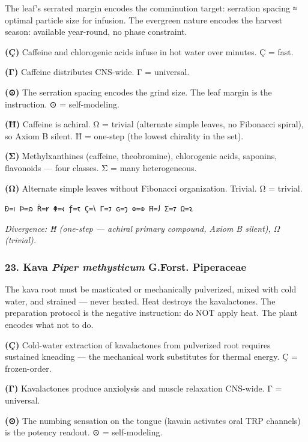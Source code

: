 \documentclass[12pt,a4paper]{article}
\begin{document}
The leaf's serrated margin encodes the comminution target: serration
spacing ≈ optimal particle size for infusion. The evergreen nature
encodes the harvest season: available year-round, no phase constraint.

\textbf{(Ç)} Caffeine and chlorogenic acids infuse in hot water over
minutes. Ç = fast.

\textbf{(Γ)} Caffeine distributes CNS-wide. Γ = universal.

\textbf{(⊙)} The serration spacing encodes the grind size. The leaf
margin is the instruction. ⊙ = self-modeling.

\textbf{(Ħ)} Caffeine is achiral. Ω = trivial (alternate simple leaves,
no Fibonacci spiral), so Axiom B silent. Ħ = one-step (the lowest
chirality in the set).

\textbf{(Σ)} Methylxanthines (caffeine, theobromine), chlorogenic acids,
saponins, flavonoids --- four classes. Σ = many heterogeneous.

\textbf{(Ω)} Alternate simple leaves without Fibonacci organization.
Trivial. Ω = trivial.

\texttt{Ð=𐑦\ Þ=𐑸\ Ř=𐑾\ Φ=𐑬\ ƒ=𐑱\ Ç=𐑘\ Γ=𐑲\ ɢ=𐑠\ ⊙=⊙\ Ħ=𐑓\ Σ=𐑳\ Ω=𐑷}

\emph{Divergence: Ħ (one-step --- achiral primary compound, Axiom B
silent), Ω (trivial).}

\hypertarget{kava-piper-methysticum-g.forst.-piperaceae}{%
\subsubsection{\texorpdfstring{23. Kava \textbar{} \emph{Piper
methysticum} G.Forst. \textbar{}
Piperaceae}{23. Kava \textbar{} Piper methysticum G.Forst. \textbar{} Piperaceae}}\label{kava-piper-methysticum-g.forst.-piperaceae}}

The kava root must be masticated or mechanically pulverized, mixed with
cold water, and strained --- never heated. Heat destroys the
kavalactones. The preparation protocol is the negative instruction: do
NOT apply heat. The plant encodes what not to do.

\textbf{(Ç)} Cold-water extraction of kavalactones from pulverized root
requires sustained kneading --- the mechanical work substitutes for
thermal energy. Ç = frozen-order.

\textbf{(Γ)} Kavalactones produce anxiolysis and muscle relaxation
CNS-wide. Γ = universal.

\textbf{(⊙)} The numbing sensation on the tongue (kavain activates oral
TRP channels) is the potency readout. ⊙ = self-modeling.
\end{document}
